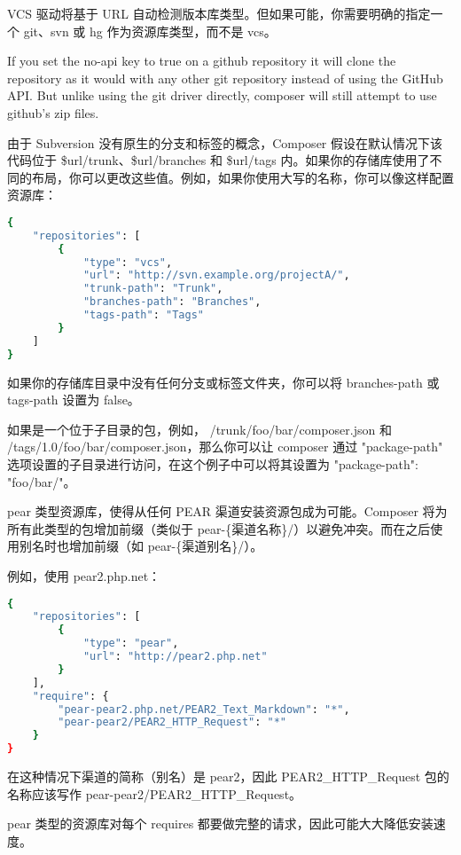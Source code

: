 VCS 驱动将基于 URL 自动检测版本库类型。但如果可能，你需要明确的指定一个 git、svn 或 hg 作为资源库类型，而不是 vcs。

If you set the no-api key to true on a github repository it will clone the repository as it would with any other git repository instead of using the GitHub API. But unlike using the git driver directly, composer will still attempt to use github's zip files.

由于 Subversion 没有原生的分支和标签的概念，Composer 假设在默认情况下该代码位于 \$url/trunk、\$url/branches 和 \$url/tags 内。如果你的存储库使用了不同的布局，你可以更改这些值。例如，如果你使用大写的名称，你可以像这样配置资源库：



\begin{lstlisting}[language=bash]
{
    "repositories": [
        {
            "type": "vcs",
            "url": "http://svn.example.org/projectA/",
            "trunk-path": "Trunk",
            "branches-path": "Branches",
            "tags-path": "Tags"
        }
    ]
}
\end{lstlisting}

如果你的存储库目录中没有任何分支或标签文件夹，你可以将 branches-path 或 tags-path 设置为 false。


如果是一个位于子目录的包，例如， /trunk/foo/bar/composer.json 和 /tags/1.0/foo/bar/composer.json，那么你可以让 composer 通过 "package-path" 选项设置的子目录进行访问，在这个例子中可以将其设置为 "package-path": "foo/bar/"。

pear 类型资源库，使得从任何 PEAR 渠道安装资源包成为可能。Composer 将为所有此类型的包增加前缀（类似于 pear-\{渠道名称\}/）以避免冲突。而在之后使用别名时也增加前缀（如 pear-\{渠道别名\}/）。

例如，使用 pear2.php.net：



\begin{lstlisting}[language=bash]
{
    "repositories": [
        {
            "type": "pear",
            "url": "http://pear2.php.net"
        }
    ],
    "require": {
        "pear-pear2.php.net/PEAR2_Text_Markdown": "*",
        "pear-pear2/PEAR2_HTTP_Request": "*"
    }
}
\end{lstlisting}

在这种情况下渠道的简称（别名）是 pear2，因此 PEAR2\_HTTP\_Request 包的名称应该写作 pear-pear2/PEAR2\_HTTP\_Request。

pear 类型的资源库对每个 requires 都要做完整的请求，因此可能大大降低安装速度。

